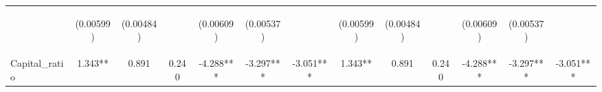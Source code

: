 \documentclass[]{article}
\begin{document}
\begin{center}
\begin{tabular}{lcccccccccccc}
\vspace{4pt} & \begin{footnotesize}(0.00599)\end{footnotesize} & \begin{footnotesize}(0.00484)\end{footnotesize} & \begin{footnotesize}\end{footnotesize} & \begin{footnotesize}(0.00609)\end{footnotesize} & \begin{footnotesize}(0.00537)\end{footnotesize} & \begin{footnotesize}\end{footnotesize} & \begin{footnotesize}(0.00599)\end{footnotesize} & \begin{footnotesize}(0.00484)\end{footnotesize} & \begin{footnotesize}\end{footnotesize} & \begin{footnotesize}(0.00609)\end{footnotesize} & \begin{footnotesize}(0.00537)\end{footnotesize} & \begin{footnotesize}\end{footnotesize} \\
Capital\_ratio & 1.343** & 0.891 & 0.240 & -4.288*** & -3.297*** & -3.051*** & 1.343** & 0.891 & 0.240 & -4.288*** & -3.297*** & -3.051*** \\

\end{tabular}
\end{center}
\end{document}
